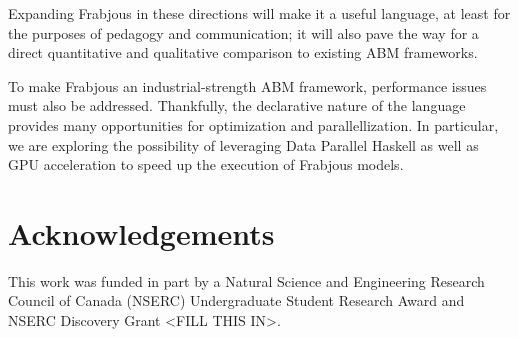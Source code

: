 \documentclass{llncs}
\begin{document}
Expanding Frabjous in these directions will make it a useful language, at least for the purposes of pedagogy and communication; it will also pave the way for a direct quantitative and qualitative comparison to existing ABM frameworks.

To make Frabjous an industrial-strength ABM framework, performance issues must also be addressed. Thankfully, the declarative nature of the language provides many opportunities for optimization and parallellization. In particular, we are exploring the possibility of leveraging Data Parallel Haskell\cite{dphaskell} as well as GPU acceleration to speed up the execution of Frabjous models. 

\section{Acknowledgements}
This work was funded in part by a Natural Science and Engineering Research Council of Canada (NSERC) Undergraduate Student Research Award and NSERC Discovery Grant <FILL THIS IN>.

  
  
  
  
   








%
\end{document}
